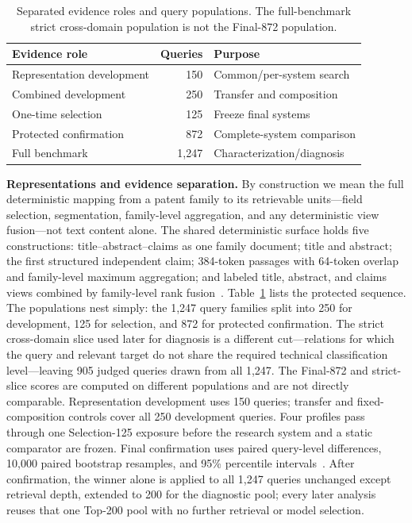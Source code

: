 \documentclass[a4paper,conference]{IEEEtran}
\begin{document}
\begin{table}[!t]
\caption{Separated evidence roles and query populations. The full-benchmark strict cross-domain population is not the Final-872 population.}
\label{tab:protocol}
\centering
\footnotesize
\setlength{\tabcolsep}{3.5pt}
\begin{tabular}{@{}lrl@{}}
\toprule
Evidence role & Queries & Purpose \\
\midrule
Representation development & 150 & Common/per-system search \\
Combined development & 250 & Transfer and composition \\
One-time selection & 125 & Freeze final systems \\
Protected confirmation & 872 & Complete-system comparison \\
Full benchmark & 1,247 & Characterization/diagnosis \\
\bottomrule
\end{tabular}
\end{table}

\textbf{Representations and evidence separation.} By construction we mean the full deterministic mapping from a patent family to its retrievable units---field selection, segmentation, family-level aggregation, and any deterministic view fusion---not text content alone. The shared deterministic surface holds five constructions: title--abstract--claims as one family document; title and abstract; the first structured independent claim; 384-token passages with 64-token overlap and family-level maximum aggregation; and labeled title, abstract, and claims views combined by family-level rank fusion~\cite{cormack2009rrf}. Table~\ref{tab:protocol} lists the protected sequence. The populations nest simply: the 1,247 query families split into 250 for development, 125 for selection, and 872 for protected confirmation. The strict cross-domain slice used later for diagnosis is a different cut---relations for which the query and relevant target do not share the required technical classification level---leaving 905 judged queries drawn from all 1,247. The Final-872 and strict-slice scores are computed on different populations and are not directly comparable. Representation development uses 150 queries; transfer and fixed-composition controls cover all 250 development queries. Four profiles pass through one Selection-125 exposure before the research system and a static comparator are frozen. Final confirmation uses paired query-level differences, 10,000 paired bootstrap resamples, and 95\% percentile intervals~\cite{davison1997bootstrap}. After confirmation, the winner alone is applied to all 1,247 queries unchanged except retrieval depth, extended to 200 for the diagnostic pool; every later analysis reuses that one Top-200 pool with no further retrieval or model selection.
\end{document}
